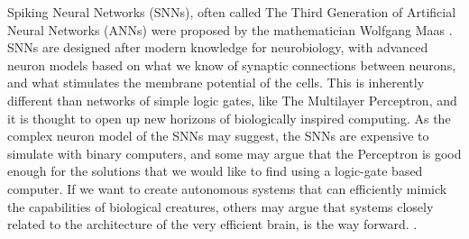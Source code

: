 Spiking Neural Networks (SNNs), often called The Third Generation of Artificial Neural Networks (ANNs) were proposed by the mathematician Wolfgang Maas \cite{maass_networks_1997}.
SNNs are designed after modern knowledge for neurobiology,
with advanced neuron models based on what we know of synaptic connections between neurons, and what stimulates the membrane potential of the cells.\cite{ghosh-dastidar_improved_2007}
This is inherently different than networks of simple logic gates, like The Multilayer Perceptron, and it is thought to open up new horizons of biologically inspired computing.\cite{cowan_discussion_1990} \cite{aamir_accelerated_2018}
As the complex neuron model of the SNNs may suggest, the SNNs are expensive to simulate with binary computers, and some may argue that the Perceptron is good enough for the solutions that we would like to find using a logic-gate based computer.
If we want to create autonomous systems that can efficiently mimick the capabilities of biological creatures, others may argue that systems closely related to the architecture of the very efficient brain, is the way forward.\cite{lee_training_2016} \cite{cao_spiking_2015}.


